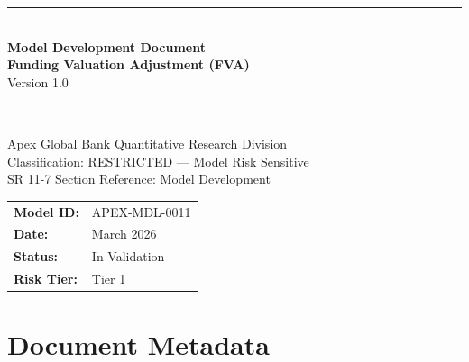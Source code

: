 \documentclass[11pt,a4paper]{article}
\begin{document}

\begin{titlepage}
  \begin{center}
    \vspace*{2cm}
    {\color{apexblue}\rule{\linewidth}{2pt}}\\[0.5cm]
    {\Huge\bfseries\color{apexblue} Model Development Document}\\[0.4cm]
    {\LARGE\bfseries Funding Valuation Adjustment (FVA)}\\[0.3cm]
    {\Large Version 1.0}\\[0.5cm]
    {\color{apexblue}\rule{\linewidth}{2pt}}\\[1cm]
    {\large Apex Global Bank \textbar{} Quantitative Research Division}\\[0.3cm]
    {\large\textcolor{apexred}{Classification: RESTRICTED --- Model Risk Sensitive}}\\[0.3cm]
    {\large SR 11-7 Section Reference: Model Development}\\[2cm]
    \begin{tabular}{ll}
      \textbf{Model ID:}   & APEX-MDL-0011 \\[4pt]
      \textbf{Date:}       & March 2026 \\[4pt]
      \textbf{Status:}     & In Validation \\[4pt]
      \textbf{Risk Tier:}  & Tier 1 \\
    \end{tabular}
  \end{center}
\end{titlepage}

\tableofcontents
\newpage

\section{Document Metadata}
\end{document}
